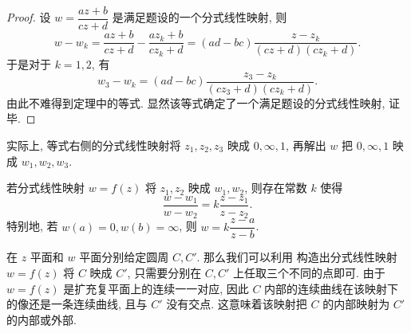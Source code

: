 \begin{proof}
  设 $w=\dfrac{az+b}{cz+d}$ 是满足题设的一个分式线性映射, 则
  \[
     w-w_k
    =\frac{az+b}{cz+d}-\frac{az_k+b}{cz_k+d}
    =(ad-bc)\frac{z-z_k}{(cz+d)(cz_k+d)}.
  \]
  于是对于 $k=1,2$, 有
  \[
    w_3-w_k
   =(ad-bc)\frac{z_3-z_k}{(cz_3+d)(cz_k+d)}.
  \]
  由此不难得到定理中的等式.
  显然该等式确定了一个满足题设的分式线性映射, 证毕.
\end{proof}

实际上, 等式右侧的分式线性映射将 $z_1,z_2,z_3$ 映成 $0,\infty,1$, 再解出 $w$ 把 $0,\infty,1$ 映成 $w_1,w_2,w_3$.

\begin{corollary}
  若分式线性映射 $w=f(z)$ 将 $z_1,z_2$ 映成 $w_1,w_2$, 则存在常数 $k$ 使得
  \[
    \frac{w-w_1}{w-w_2}=k\frac{z-z_1}{z-z_2}.
  \]
  特别地, 若 $w(a)=0,w(b)=\infty$, 则 $w=k\dfrac{z-a}{z-b}$.
\end{corollary}

在 $z$ 平面和 $w$ 平面分别给定圆周 $C,C'$.
那么我们可以利用 构造出分式线性映射 $w=f(z)$ 将 $C$ 映成 $C'$, 只需要分别在 $C,C'$ 上任取三个不同的点即可.
由于 $w=f(z)$ 是扩充复平面上的连续一一对应, 因此 $C$ 内部的连续曲线在该映射下的像还是一条连续曲线, 且与 $C'$ 没有交点.
这意味着该映射把 $C$ 的内部映射为 $C'$ 的内部或外部.

